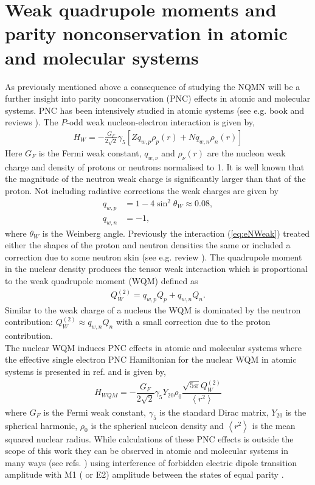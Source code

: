 \documentclass[8pt,a4paper, twoside]{report}
\begin{document}
\section{Weak quadrupole moments and parity nonconservation in atomic and molecular systems\label{sec:PNC}} 
As previously mentioned above a consequence of studying the NQMN will be a further insight into parity nonconservation (PNC) effects in atomic and molecular systems. PNC has been intensively studied in atomic systems (see e.g. book \cite{KhriplovichPNC} and reviews \cite{RobertsReview, GingesReview}).  The $P$-odd weak nucleon-electron interaction is given by,
\begin{align} \label{eq:eNWeak}
H_W = -\frac{G_F}{2\sqrt{2}}\gamma_{5}\left[Zq_{w, p}\rho_{p}(r) + Nq_{w, n}\rho_{n}(r)\right]
\end{align}
Here $G_F$ is the Fermi weak constant, $q_{w,\nu}$ and $\rho_{\nu}(r)$ are the nucleon weak charge  and density of protons or neutrons  normalised to 1. It is well known that the magnitude of the neutron weak charge is significantly larger than that of the proton. Not including radiative corrections the weak charges  are given by 
\begin{align*}
q_{w,p} &= 1 - 4\sin^2\theta_W \approx 0.08 ,\\
q_{w,n} &= -1,
\end{align*}
where $\theta_W$ is the Weinberg angle.  Previously the interaction (\ref{eq:eNWeak}) treated either the shapes of the proton and neutron densities  the same  or included a correction due to some neutron skin (see e.g. review \cite{RobertsReview}).  The quadrupole moment in the nuclear density produces the tensor weak interaction which is proportional to the weak quadrupole moment (WQM) defined as  \cite{FDC17}
\begin{align*}
Q_{W}^{(2)} = q_{w,p}Q_{p} + q_{w,n}Q_n.
\end{align*}
Similar to the weak charge of a nucleus the WQM is dominated by the neutron contribution:  $Q_{W}^{(2)} \approx q_{w,n}Q_n$  with a small correction due to the proton contribution. \\

The nuclear WQM induces PNC effects in atomic and molecular systems where the effective single electron  PNC Hamiltonian for the nuclear WQM in atomic systems is presented in ref. \cite{FDC17} and is given by,
\begin{align*}
H_{WQM}=-\dfrac{G_F}{2\sqrt{2}}\gamma_5Y_{20}\rho_{0}\dfrac{\sqrt{5\pi}Q_{W}^{(2)}}{\left<r^2\right>}
\end{align*}
where $G_F$ is the Fermi weak constant, $\gamma_5$ is the standard Dirac matrix, $Y_{20}$ is the spherical harmonic, $\rho_0$ is the spherical nucleon density and $\left<r^2\right>$ is the mean squared nuclear radius. While calculations of these PNC effects is outside the scope of this work they can be observed in atomic and molecular systems in many ways (see refs. \cite{FDC17, RobertsReview, KhriplovichPNC, GingesReview}) using interference of forbidden electric dipole transition amplitude with M1 ( or E2) amplitude between the states of equal parity \cite{FDC17}.
\end{document}
